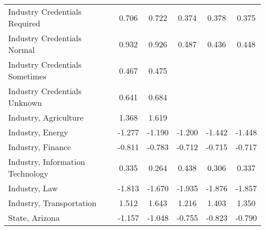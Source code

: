 {\begin{center}
{\begin{longtable}{l*{5}{c}}
Industry Credentials Required&       0.706\sym{*}  &       0.722\sym{**} &       0.374         &       0.378         &       0.375         \\
\addlinespace
Industry Credentials Normal&       0.932\sym{**} &       0.926\sym{**} &       0.487\sym{*}  &       0.436\sym{*}  &       0.448\sym{*}  \\
\addlinespace
Industry Credentials Sometimes&       0.467         &       0.475         &                     &                     &                     \\
\addlinespace
Industry Credentials Unknown&       0.641\sym{*}  &       0.684\sym{**} &                     &                     &                     \\
\addlinespace
Industry, Agriculture    &       1.368         &       1.619\sym{*}  &                     &                     &                     \\
\addlinespace
Industry, Energy         &      -1.277\sym{*}  &      -1.190\sym{*}  &      -1.200\sym{*}  &      -1.442\sym{**} &      -1.448\sym{**} \\
\addlinespace
Industry, Finance &      -0.811\sym{***}&      -0.783\sym{***}&      -0.712\sym{***}&      -0.715\sym{***}&      -0.717\sym{***}\\
\addlinespace
Industry, Information Technology&       0.335         &       0.264         &       0.438\sym{*}  &       0.306         &       0.337         \\
\addlinespace
Industry, Law            &      -1.813\sym{***}&      -1.670\sym{**} &      -1.935\sym{***}&      -1.876\sym{***}&      -1.857\sym{***}\\
\addlinespace
Industry, Transportation &       1.512\sym{*}  &       1.643\sym{**} &       1.216         &       1.403\sym{*}  &       1.350\sym{*}  \\
\addlinespace
State, Arizona           &      -1.157\sym{**} &      -1.048\sym{**} &      -0.755         &      -0.823\sym{*}  &      -0.790         \\

\end{longtable}}
\end{center}}
